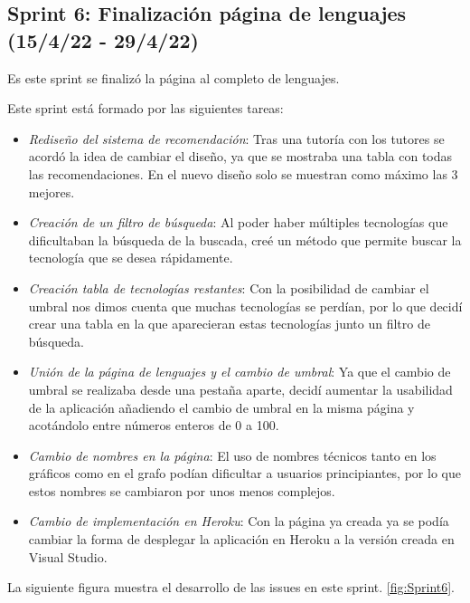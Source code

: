 \subsection{Sprint 6: Finalización página de lenguajes (15/4/22 - 29/4/22)}
Es este sprint se finalizó la página al completo de lenguajes.

Este sprint está formado por las siguientes tareas:
\begin{itemize}
    \item \textit{Rediseño del sistema de recomendación}: Tras una tutoría con los tutores se acordó la idea de cambiar el diseño, ya que se mostraba una tabla con todas las recomendaciones. En el nuevo diseño solo se muestran como máximo las 3 mejores.
    
    \item \textit{Creación de un filtro de búsqueda}: Al poder haber múltiples tecnologías que dificultaban la búsqueda de la buscada, creé un método que permite buscar la tecnología que se desea rápidamente.
    
    \item \textit{Creación tabla de tecnologías restantes}: Con la posibilidad de cambiar el umbral nos dimos cuenta que muchas tecnologías se perdían, por lo que decidí crear una tabla en la que aparecieran estas tecnologías junto un filtro de búsqueda.
    
    \item \textit{Unión de la página de lenguajes y el cambio de umbral}: Ya que el cambio de umbral se realizaba desde una pestaña aparte, decidí aumentar la usabilidad de la aplicación añadiendo el cambio de umbral en la misma página y acotándolo entre números enteros de 0 a 100.
    
    \item \textit{Cambio de nombres en la página}: El uso de nombres técnicos tanto en los gráficos como en el grafo podían dificultar a usuarios principiantes, por lo que estos nombres se cambiaron por unos menos complejos.
    
    \item \textit{Cambio de implementación en Heroku}: Con la página ya creada ya se podía cambiar la forma de desplegar la aplicación en Heroku a la versión creada en Visual Studio.
\end{itemize}

La siguiente figura muestra el desarrollo de las issues en este sprint. \ref{fig:Sprint6}.



